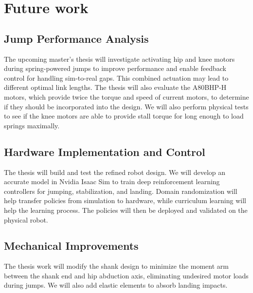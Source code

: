 \section{Future work}
\label{sec:future_work}

\subsection{Jump Performance Analysis}
The upcoming master's thesis will investigate activating hip and knee motors during spring-powered jumps to improve performance and enable feedback control for handling sim-to-real gaps. This combined actuation may lead to different optimal link lengths. The thesis will also evaluate the A80BHP-H motors, which provide twice the torque and speed of current motors, to determine if they should be incorporated into the design. We will also perform physical tests to see if the knee motors are able to provide stall torque for long enough to load springs maximally.

\subsection{Hardware Implementation and Control}
The thesis will build and test the refined robot design. We will develop an accurate model in Nvidia Isaac Sim to train deep reinforcement learning controllers for jumping, stabilization, and landing. Domain randomization will help transfer policies from simulation to hardware, while curriculum learning will help the learning process. The policies will then be deployed and validated on the physical robot.

\subsection{Mechanical Improvements} 
The thesis work will modify the shank design to minimize the moment arm between the shank end and hip abduction axis, eliminating undesired motor loads during jumps. We will also add elastic elements to absorb landing impacts.